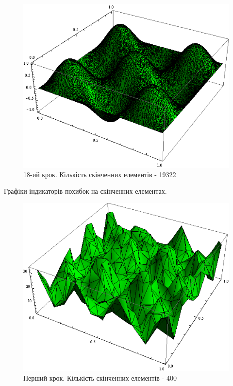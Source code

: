 \begin{figure}[H]
	\centering
    \includegraphics[scale=0.7]{problem1/my/solutions/18}
    \caption{18-ий крок. Кількість скінченних елементів - 19322}
    \label{fig:p1_solution18}
\end{figure}
%
Графіки індикаторів похибок на скінченних елементах.
%
\begin{figure}[H]
	\centering
    \includegraphics[scale=0.8]{problem1/my/AEE/1}
    \caption{Перший крок. Кількість скінченних елементів - 400}
    \label{fig:p1_aee1}
\end{figure}

